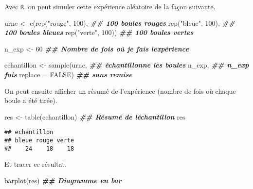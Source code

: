 \documentclass[
]{article}
\newenvironment{Shaded}{\begin{snugshade}}{\end{snugshade}}
\newcommand{\AttributeTok}[1]{\textcolor[rgb]{0.77,0.63,0.00}{#1}}
\newcommand{\ConstantTok}[1]{\textcolor[rgb]{0.00,0.00,0.00}{#1}}
\newcommand{\DecValTok}[1]{\textcolor[rgb]{0.00,0.00,0.81}{#1}}
\newcommand{\DocumentationTok}[1]{\textcolor[rgb]{0.56,0.35,0.01}{\textbf{\textit{#1}}}}
\newcommand{\FunctionTok}[1]{\textcolor[rgb]{0.00,0.00,0.00}{#1}}
\newcommand{\NormalTok}[1]{#1}
\newcommand{\OtherTok}[1]{\textcolor[rgb]{0.56,0.35,0.01}{#1}}
\newcommand{\StringTok}[1]{\textcolor[rgb]{0.31,0.60,0.02}{#1}}
\begin{document}
Avec \texttt{R}, on peut simuler cette expérience aléatoire de la façon
suivante.

\begin{Shaded}
\begin{Highlighting}[]
\NormalTok{urne }\OtherTok{\textless{}{-}} \FunctionTok{c}\NormalTok{(}\FunctionTok{rep}\NormalTok{(}\StringTok{"rouge"}\NormalTok{, }\DecValTok{100}\NormalTok{),           }\DocumentationTok{\#\# 100 boules rouges}
          \FunctionTok{rep}\NormalTok{(}\StringTok{"bleue"}\NormalTok{, }\DecValTok{100}\NormalTok{),           }\DocumentationTok{\#\# 100 boules bleues}
          \FunctionTok{rep}\NormalTok{(}\StringTok{"verte"}\NormalTok{, }\DecValTok{100}\NormalTok{))           }\DocumentationTok{\#\# 100 boules vertes }

\NormalTok{n\_exp }\OtherTok{\textless{}{-}} \DecValTok{60}                            \DocumentationTok{\#\# Nombre de fois où je fais l\textquotesingle{}expérience}

\NormalTok{echantillon }\OtherTok{\textless{}{-}} \FunctionTok{sample}\NormalTok{(urne,            }\DocumentationTok{\#\# échantillonne les boules}
\NormalTok{                      n\_exp,           }\DocumentationTok{\#\# n\_exp fois}
                      \AttributeTok{replace =} \ConstantTok{FALSE}\NormalTok{) }\DocumentationTok{\#\# sans remise}
\end{Highlighting}
\end{Shaded}

On peut ensuite afficher un résumé de l'expérience (nombre de fois où
chaque boule a été tirée).

\begin{Shaded}
\begin{Highlighting}[]
\NormalTok{res }\OtherTok{\textless{}{-}} \FunctionTok{table}\NormalTok{(echantillon)             }\DocumentationTok{\#\# Résumé de l\textquotesingle{}échantillon}
\NormalTok{res}
\end{Highlighting}
\end{Shaded}

\begin{verbatim}
## echantillon
## bleue rouge verte 
##    24    18    18
\end{verbatim}

Et tracer ce résultat.

\begin{Shaded}
\begin{Highlighting}[]
\FunctionTok{barplot}\NormalTok{(res)                          }\DocumentationTok{\#\# Diagramme en bar}
\end{Highlighting}
\end{Shaded}
\end{document}
